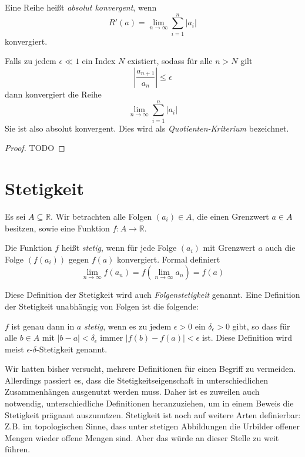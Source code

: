 \begin{definition}
Eine Reihe heißt \emph{absolut konvergent}, wenn 
\[
R'(a) = \lim_{n\rightarrow \infty} \sum_{i=1}^{n} \vert a_i \vert
\]
konvergiert.
\end{definition}

\begin{lemma}
Falls zu jedem $\epsilon \ll 1$ ein Index $N$ existiert, sodass für alle $n>N$ gilt
\[
\left\vert \frac{a_{n+1}}{a_n} \right\vert \le \epsilon
\]
dann konvergiert die Reihe 
\[
\lim\limits_{n\rightarrow \infty} \sum_{i=1}^{n} \vert a_i \vert
\]
Sie ist also absolut konvergent. Dies wird als \emph{Quotienten-Kriterium} bezeichnet.
\end{lemma}
\begin{proof}
TODO
\end{proof}


\section{Stetigkeit}

Es sei $A\subseteq \mathbb{R}$. Wir betrachten alle Folgen $(a_i)\in A$, die einen Grenzwert $a\in A$ besitzen, sowie eine Funktion $f: A\longrightarrow \mathbb{R}$. 

\begin{definition}
Die Funktion $f$ heißt \emph{stetig}, wenn für jede Folge $(a_i)$ mit Grenzwert $a$ auch die Folge $(f(a_i))$ gegen $f(a)$ konvergiert. Formal definiert
\[
\lim_{n\rightarrow \infty} f(a_n) = f(\lim_{n\rightarrow \infty} a_n) = f(a)
\]
\end{definition}

Diese Definition der Stetigkeit wird auch \emph{Folgenstetigkeit} genannt. Eine Definition der Stetigkeit unabhängig von Folgen ist die folgende: 

\begin{definition}
$f$ ist genau dann in $a$ \emph{stetig}, wenn es zu jedem $\epsilon>0$ ein $\delta_\epsilon > 0$ gibt, so dass für alle $b\in A$ mit $\vert b-a\vert < \delta_\epsilon $ immer $\vert f(b)-f(a)\vert < \epsilon$ ist. Diese Definition wird meist $\epsilon$-$\delta$-Stetigkeit genannt. 
\end{definition}

Wir hatten bisher versucht, mehrere Definitionen für einen Begriff zu vermeiden. Allerdings passiert es, dass die Stetigkeitseigenschaft in unterschiedlichen Zusammenhängen ausgenutzt werden muss. Daher ist es zuweilen auch notwendig, unterschiedliche Definitionen heranzuziehen, um in einem Beweis die Stetigkeit prägnant auszunutzen. Stetigkeit ist noch auf weitere Arten definierbar: Z.B. im topologischen Sinne, dass unter stetigen Abbildungen die Urbilder offener Mengen wieder offene Mengen sind. Aber das würde an dieser Stelle zu weit führen.

